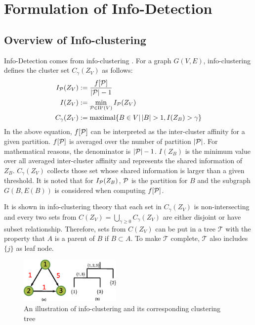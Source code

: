 \documentclass[runningheads]{llncs}
\begin{document}
\section{Formulation of Info-Detection}\label{sec:ID}
\subsection{Overview of Info-clustering}
Info-Detection comes from info-clustering \cite{RN1}. For a graph $G(V,E)$, info-clustering defines the cluster set $C_{\gamma}(Z_V)$ as follows:
\begin{align}
I_{\P}(Z_V) & := \frac{ f[\P] }{  \abs{\mathcal{P}} - 1 } \label{eq:IP}\\
I(Z_V) & := \min_{\mathcal{P} \in \Pi'(V)} I_{\mathcal{P}}(Z_V)  \label{eq:ms} \\
C_{\gamma}(Z_V) & := \textrm{maximal}\{ B \in V \vert \, \abs{B} > 1, I(Z_B) > \gamma \} \label{eq:CgZv}
\end{align}
In the above equation, $f[\P]$ can be interpreted as the inter-cluster affinity for a given partition. $f[\P]$ is averaged over the number of partition $\abs{\P}$. For mathematical reasons, the denominator is $\abs{\P}-1$. $I(Z_B)$ is the minimum value over all averaged inter-cluster affinity and represents the shared information of $Z_B$. $C_{\gamma}(Z_V)$ collects those set whose shared information is larger than a given threshold. It is noted that for $I_{\P}(Z_B)$, $\P$ is the partition for $B$ and the subgraph $G(B,E(B))$ is considered when computing $f[\P]$.

It is shown in info-clustering theory that each set in $C_{\gamma} (Z_V)$ is non-intersecting and every two sets from $C(Z_V)=\bigcup_{\gamma \geq 0} C_{\gamma}(Z_V)$ are either disjoint or have subset relationship. Therefore, sets from $C(Z_V)$ can be put in a tree $\mathcal{T}$ with the property that $A$ is a parent of $B$ if $B\subset A$. To make $\mathcal{T}$ complete, $\mathcal{T}$ also includes $\{j\}$ as leaf node. 

\begin{figure}
	\begin{center}
		\includegraphics[width=0.44\textwidth]{pic/example_directed.eps}
	\end{center}
	\caption{An illustration of info-clustering and its corresponding clustering tree}\label{fig:first_illustration}
\end{figure}
\end{document}
